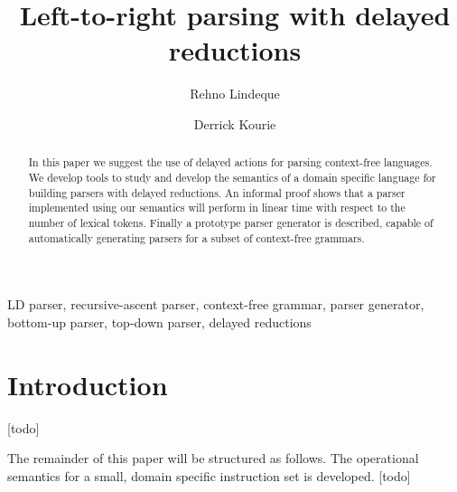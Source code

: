 \documentclass[envcountsame,runningheads]{llncs}
\begin{document}
\title{Left-to-right parsing with delayed reductions}
\author{Rehno Lindeque \and Derrick Kourie}
\maketitle

\begin{abstract}
In this paper we suggest the use of delayed actions for parsing context-free languages.
We develop tools to study and develop the semantics of a domain specific language for building parsers with delayed reductions.
An informal proof shows that a parser implemented using our semantics will perform in linear time with respect to the number of lexical tokens.
Finally a prototype parser generator is described, capable of automatically generating parsers for a subset of context-free grammars.
\end{abstract}

\begin{keywords}
LD parser, recursive-ascent parser, context-free grammar, parser generator, bottom-up parser, top-down parser, delayed reductions
\end{keywords}

\section{Introduction}

[todo]

The remainder of this paper will be structured as follows. 
The operational semantics for a small, domain specific instruction set is developed.
[todo]


%

\end{document}
